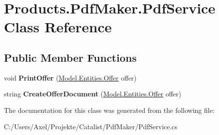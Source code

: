 \hypertarget{class_products_1_1_pdf_maker_1_1_pdf_service}{}\section{Products.\+Pdf\+Maker.\+Pdf\+Service Class Reference}
\label{class_products_1_1_pdf_maker_1_1_pdf_service}
\subsection*{Public Member Functions}
\begin{DoxyCompactItemize}
\item 
void {\bfseries Print\+Offer} (\hyperlink{class_products_1_1_model_1_1_entities_1_1_offer}{Model.\+Entities.\+Offer} offer)\hypertarget{class_products_1_1_pdf_maker_1_1_pdf_service_a4731aa1d5d85329bc1074c50f9cbb2b2}{}\label{class_products_1_1_pdf_maker_1_1_pdf_service_a4731aa1d5d85329bc1074c50f9cbb2b2}

\item 
string {\bfseries Create\+Offer\+Document} (\hyperlink{class_products_1_1_model_1_1_entities_1_1_offer}{Model.\+Entities.\+Offer} offer)\hypertarget{class_products_1_1_pdf_maker_1_1_pdf_service_a981fe5de1ddd41cbb5d0ce4ff0500977}{}\label{class_products_1_1_pdf_maker_1_1_pdf_service_a981fe5de1ddd41cbb5d0ce4ff0500977}

\end{DoxyCompactItemize}


The documentation for this class was generated from the following file\+:\begin{DoxyCompactItemize}
\item 
C\+:/\+Users/\+Axel/\+Projekte/\+Catalist/\+Pdf\+Maker/Pdf\+Service.\+cs\end{DoxyCompactItemize}
